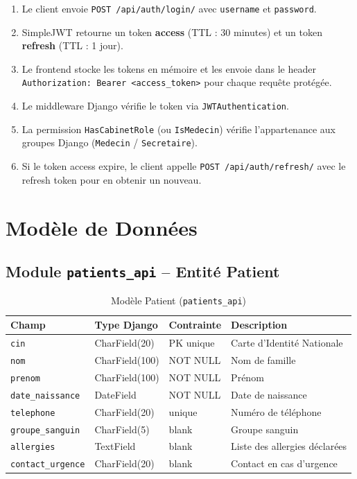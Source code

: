\documentclass[12pt,a4paper]{report}
\begin{document}
\begin{enumerate}[leftmargin=*]
  \item Le client envoie \texttt{POST /api/auth/login/} avec \texttt{username} et \texttt{password}.
  \item SimpleJWT retourne un token \textbf{access} (TTL : 30 minutes) et un token \textbf{refresh} (TTL : 1 jour).
  \item Le frontend stocke les tokens en mémoire et les envoie dans le header \texttt{Authorization: Bearer <access\_token>} pour chaque requête protégée.
  \item Le middleware Django vérifie le token via \texttt{JWTAuthentication}.
  \item La permission \texttt{HasCabinetRole} (ou \texttt{IsMedecin}) vérifie l'appartenance aux groupes Django (\texttt{Medecin} / \texttt{Secretaire}).
  \item Si le token access expire, le client appelle \texttt{POST /api/auth/refresh/} avec le refresh token pour en obtenir un nouveau.
\end{enumerate}

\chapter{Modèle de Données}

\section{Module \texttt{patients\_api} -- Entité Patient}

\begin{table}[H]
\centering
\caption{Modèle Patient (\texttt{patients\_api})}
\renewcommand{\arraystretch}{1.4}
\begin{tabular}{|p{3.8cm}|p{3cm}|p{3cm}|p{3.7cm}|}
  \hline
  \rowcolor{medaccent}
  \textbf{Champ} & \textbf{Type Django} & \textbf{Contrainte} & \textbf{Description} \\
  \hline
  \texttt{cin} & CharField(20) & PK unique & Carte d'Identité Nationale \\
  \hline
  \texttt{nom} & CharField(100) & NOT NULL & Nom de famille \\
  \hline
  \texttt{prenom} & CharField(100) & NOT NULL & Prénom \\
  \hline
  \texttt{date\_naissance} & DateField & NOT NULL & Date de naissance \\
  \hline
  \texttt{telephone} & CharField(20) & unique & Numéro de téléphone \\
  \hline
  \texttt{groupe\_sanguin} & CharField(5) & blank & Groupe sanguin \\
  \hline
  \texttt{allergies} & TextField & blank & Liste des allergies déclarées \\
  \hline
  \texttt{contact\_urgence} & CharField(20) & blank & Contact en cas d'urgence \\
  \hline
\end{tabular}
\end{table}
\end{document}

